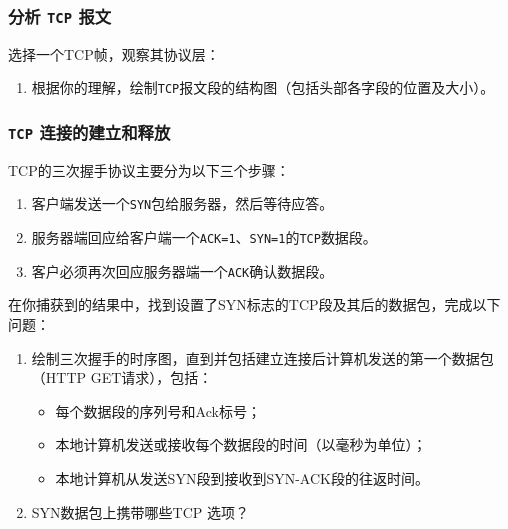 \documentclass{article}
\begin{document}
\subsubsection{分析 \texttt{TCP} 报文}

选择一个TCP帧，观察其协议层：

\begin{enumerate}[noitemsep]
  \item 根据你的理解，绘制\texttt{TCP}报文段的结构图（包括头部各字段的位置及大小）。
\end{enumerate}

\subsubsection{\texttt{TCP} 连接的建立和释放}

TCP的三次握手协议主要分为以下三个步骤：
\begin{enumerate}[noitemsep]
  \item 客户端发送一个\texttt{SYN}包给服务器，然后等待应答。
  \item 服务器端回应给客户端一个\texttt{ACK=1}、\texttt{SYN=1}的\texttt{TCP}数据段。
  \item 客户必须再次回应服务器端一个\texttt{ACK}确认数据段。
\end{enumerate}

在你捕获到的结果中，找到设置了SYN标志的TCP段及其后的数据包，完成以下问题： 

\begin{enumerate}[noitemsep]
  \item 绘制三次握手的时序图，直到并包括建立连接后计算机发送的第一个数据包（HTTP GET请求），包括：
  \begin{itemize}
  	\item 每个数据段的序列号和Ack标号；
  	\item 本地计算机发送或接收每个数据段的时间（以毫秒为单位）；
  	\item 本地计算机从发送SYN段到接收到SYN-ACK段的往返时间。
  \end{itemize}
  \item SYN数据包上携带哪些TCP 选项？
\end{enumerate}
\end{document}
